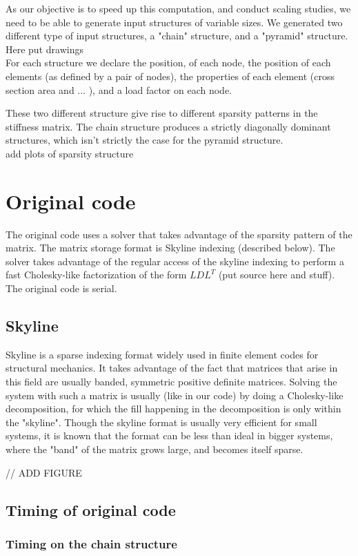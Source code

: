 \documentclass[11pt]{article}
\begin{document}
As our objective is to speed up this computation, and conduct scaling studies, we need to be able to generate input structures of variable sizes.
We generated two different type of input structures, a "chain" structure, and a "pyramid" structure.
\\
Here put drawings
\\
For each structure we declare the position, of each node, the position of each elements (as defined by a pair of nodes), the properties of each element (cross section area and ... ), and a load factor on each node.

These two different structure give rise to different sparsity patterns in the stiffness matrix. The chain structure produces a strictly diagonally dominant structures, which isn't strictly the case for the pyramid structure.
\\
add plots of sparsity structure

\section{Original code}
The original code uses a solver that takes advantage of the sparsity pattern of the matrix. The matrix storage format is Skyline indexing (described below). The solver takes advantage of the regular access of the skyline indexing to perform a fast Cholesky-like factorization of the form $LDL^T$ (put source here and stuff). The original code is serial.


\subsection{Skyline}
Skyline is a sparse indexing format widely used in finite element codes for structural mechanics. It takes advantage of the fact that matrices that arise in this field are usually banded, symmetric positive definite matrices. Solving the system with such a matrix is usually (like in our code) by doing a Cholesky-like decomposition, for which the fill happening in the decomposition is only within the "skyline".
Though the skyline format is usually very efficient for small systems, it is known that the format can be less than ideal in bigger systems, where the "band" of the matrix grows large, and becomes itself  sparse.

// 
ADD FIGURE
\subsection{Timing of original code}
\subsubsection{Timing on the chain structure}
\end{document}
